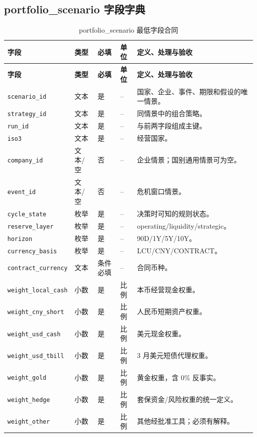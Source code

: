 \documentclass[UTF8,fontset=windows,12pt,openany]{ctexbook}
\newcommand{\Field}[1]{{\small\nolinkurl{#1}}}
\begin{document}
\clearpage
\begin{landscape}
\chapter{portfolio\_scenario 字段字典}
\begin{longtable}{p{4.0cm}p{2.2cm}p{2.2cm}p{2.5cm}p{7.4cm}}
\caption{portfolio\_scenario 最低字段合同}\label{tab:dict-portfolio}\\
\toprule
\textbf{字段} & \textbf{类型} & \textbf{必填} & \textbf{单位} & \textbf{定义、处理与验收}\\
\midrule
\endfirsthead
\toprule \textbf{字段} & \textbf{类型} & \textbf{必填} & \textbf{单位} & \textbf{定义、处理与验收}\\ \midrule
\endhead
\Field{scenario_id} & 文本 & 是 & -- & 国家、企业、事件、期限和假设的唯一情景。\\
\Field{strategy_id} & 文本 & 是 & -- & 同情景中的组合策略。\\
\Field{run_id} & 文本 & 是 & -- & 与前两字段组成主键。\\
\Field{iso3} & 文本 & 是 & -- & 经营国家。\\
\Field{company_id} & 文本/空 & 否 & -- & 企业情景；国别通用情景可为空。\\
\Field{event_id} & 文本/空 & 否 & -- & 危机窗口情景。\\
\Field{cycle_state} & 枚举 & 是 & -- & 决策时可知的规则状态。\\
\Field{reserve_layer} & 枚举 & 是 & -- & operating/liquidity/strategic。\\
\Field{horizon} & 枚举 & 是 & -- & 90D/1Y/5Y/10Y。\\
\Field{currency_basis} & 枚举 & 是 & -- & LCU/CNY/CONTRACT。\\
\Field{contract_currency} & 文本 & 条件必填 & -- & 合同币种。\\
\Field{weight_local_cash} & 小数 & 是 & 比例 & 本币经营现金权重。\\
\Field{weight_cny_short} & 小数 & 是 & 比例 & 人民币短期资产权重。\\
\Field{weight_usd_cash} & 小数 & 是 & 比例 & 美元现金权重。\\
\Field{weight_usd_tbill} & 小数 & 是 & 比例 & 3 月美元短债代理权重。\\
\Field{weight_gold} & 小数 & 是 & 比例 & 黄金权重，含 0\% 反事实。\\
\Field{weight_hedge} & 小数 & 是 & 比例 & 套保资金/风险权重的统一定义。\\
\Field{weight_other} & 小数 & 是 & 比例 & 其他经批准工具；必须有解释。\\

\end{longtable}
\end{landscape}
\end{document}
